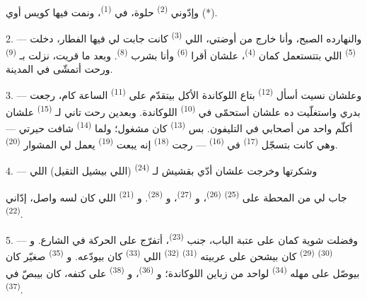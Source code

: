 وإدّوني  \textsuperscript{(2)} حلوة، في 
\textsuperscript{(1)}، ونمت فيها كويس أوي (*).

2. --- والنهارده الصبح، وأنا خارج من أوضتي، اللي 
\textsuperscript{(3)} كانت جابت لي فيها الفطار، دخلت 
\textsuperscript{(5)} اللي بتتستعمل كمان  \textsuperscript{(4)}،
علشان أقرا  \textsuperscript{(6)} وأنا بشرب 
\textsuperscript{(8)}. وبعد ما قريت، نزلت بـ \textsuperscript{(9)}
ورحت أتمشّى في المدينة.

3. --- وعلشان نسيت أسأل  \textsuperscript{(12)} بتاع اللوكاندة
الأكل بيتقدّم على  \textsuperscript{(11)} الساعة كام، رجعت
بدري واستغلّيت ده علشان أستحمّى في  \textsuperscript{(10)} اللوكاندة.
وبعدين رحت تاني لـ \textsuperscript{(15)} علشان أكلّم واحد من أصحابي
في التليفون. بس  \textsuperscript{(13)} كان مشغول؛ ولما
 \textsuperscript{(14)} شافت حيرتي --- وهي كانت بتسجّل
 \textsuperscript{(17)} في  \textsuperscript{(16)}
--- رجت  \textsuperscript{(18)} إنه يبعت 
\textsuperscript{(19)} يعمل لي المشوار  \textsuperscript{(20)}.

4. --- وشكرتها وخرجت علشان أدّي بقشيش لـ \textsuperscript{(24)} (اللي
بيشيل التقيل) اللي

جاب لي من المحطة على  \textsuperscript{(25)}  \textsuperscript{(26)}، و \textsuperscript{(27)}،
و \textsuperscript{(28)}. و \textsuperscript{(21)}
اللي كان لسه واصل، إدّاني  \textsuperscript{(22)}.

5. --- وفضلت شوية كمان على عتبة الباب، جنب 
\textsuperscript{(23)}، أتفرّج على الحركة في الشارع. و
\textsuperscript{(30)}  \textsuperscript{(29)} كان بيشحن على عربيته
 \textsuperscript{(31)}  \textsuperscript{(32)} اللي
 \textsuperscript{(33)} كان بيودّعه. و
\textsuperscript{(35)} صغيّر كان بيوصّل على مهله  \textsuperscript{(34)}
لواحد من زباين اللوكاندة؛ و \textsuperscript{(36)}، و
\textsuperscript{(38)} على كتفه، كان بيبصّ في  \textsuperscript{(37)}.

